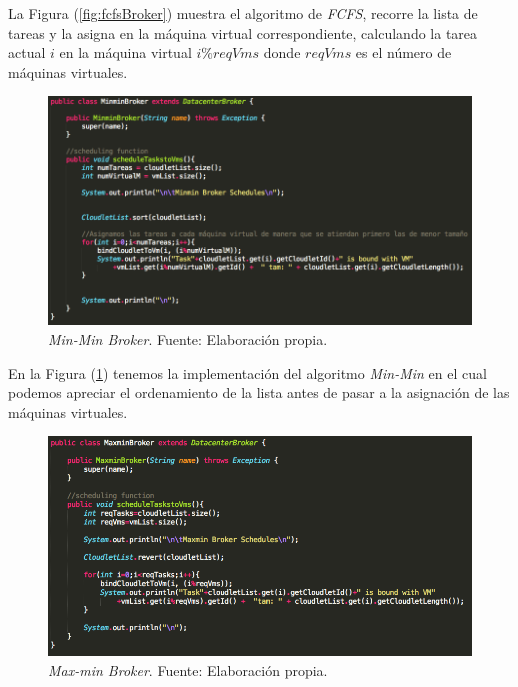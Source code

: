 La Figura (\ref{fig:fcfsBroker}) muestra el algoritmo de \textit{FCFS}, recorre la lista de tareas y la asigna en la m\'aquina virtual correspondiente, calculando la tarea actual $i$ en la m\'aquina virtual \textbf{$i\%reqVms$} donde \textbf{$reqVms$} es el n\'umero de m\'aquinas virtuales.

\setcounter{figure}{13}
\renewcommand\thefigure{\arabic{figure}}
\begin{figure}[h!]
	\centering
	\includegraphics[scale=0.5]{media/minmin_broker}
	\caption{\textit{Min-Min Broker}. Fuente: Elaboración propia.}
	\label{fig:minminBroker}
\end{figure}

\newpage

En la Figura (\ref{fig:minminBroker}) tenemos la implementaci\'on del algoritmo \textit{Min-Min} en el cual podemos apreciar el ordenamiento de la lista antes de pasar a  la asignaci\'on de las m\'aquinas virtuales.

\newpage
\setcounter{figure}{14}
\renewcommand\thefigure{\arabic{figure}}
\begin{figure}[h!]
	\centering
	\includegraphics[scale=0.5]{media/maxmin_broker}
	\caption{\textit{Max-min Broker}. Fuente: Elaboración propia.}
	\label{fig:maxminBroker}
\end{figure}

